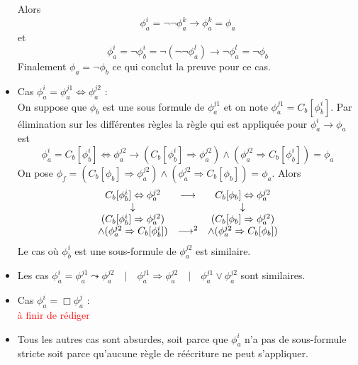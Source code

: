 \documentclass[12pt]{article}
\newcommand{\lra}{\ensuremath{\longrightarrow}}
\newcommand{\qbq}{\ensuremath{\quad | \quad}}
\newcommand{\raph}[1]{\textcolor{red}{#1}}
\begin{document}
\begin{itemize}
  Alors
  \[\phi_a^i = \neg \neg \phi_a^k \lra \phi_a^k = \phi_a\]
  et
  \[\phi_a^i = \neg \phi_b^i = \neg (\neg \neg \phi_a^l) \lra \neg \phi_a^l = \neg \phi_b\]
  Finalement \(\phi_a = \neg \phi_b\) ce qui conclut la preuve pour ce cas.
\item Cas \(\phi_a^i = \phi_a^{j1} \Leftrightarrow \phi_a^{j2}\) : \\
  On suppose que \(\phi_b\) est une sous formule de \(\phi_a^{j1}\) et on note \(\phi_a^{j1} = C_b[\phi_b^i]\).
  Par élimination sur les différentes règles la règle qui est appliquée pour \(\phi_a^i \lra \phi_a\) est
  \[\phi_a^i = C_b[\phi_b^i] \Leftrightarrow \phi_a^{j2} \lra (C_b[\phi_b^i] \Rightarrow \phi_a^{j2}) \land (\phi_a^{j2} \Rightarrow C_b[\phi_b^i]) = \phi_a\]
  On pose \(\phi_f = (C_b[\phi_b] \Rightarrow \phi_a^{j2}) \land (\phi_a^{j2} \Rightarrow C_b[\phi_b]) = \phi_a\).
  Alors
  \[\begin{array}{c c c}
      C_b[\phi_b^i] \Leftrightarrow \phi_a^{j2} & \lra & C_b[\phi_b] \Leftrightarrow \phi_a^{j2} \\
      \downarrow & & \downarrow \\
      (C_b[\phi_b^i] \Rightarrow \phi_a^{j2}) & & (C_b[\phi_b] \Rightarrow \phi_a^{j2}) \\
      \land (\phi_a^{j2} \Rightarrow C_b[\phi_b^i]) & \lra^2 & \land (\phi_a^{j2} \Rightarrow C_b[\phi_b])
    \end{array} \]
  Le cas où \(\phi_b^i\) est une sous-formule de \(\phi_a^{j2}\) est similaire.
\item Les cas \(\phi_a^i =
  \phi_a^{j1} \leadsto \phi_a^{j2} \qbq
  \phi_a^{j1} \Rightarrow \phi_a^{j2} \qbq
  \phi_a^{j1} \lor \phi_a^{j2}\)
  sont similaires.
\item Cas \(\phi_a^i = \Box \phi_a^j\) : \\
  \raph{à finir de rédiger}
\item
  Tous les autres cas sont absurdes, soit parce que \(\phi_a^i\) n'a pas de sous-formule stricte soit parce qu'aucune règle de réécriture ne peut s'appliquer.
\end{itemize}
\end{document}
